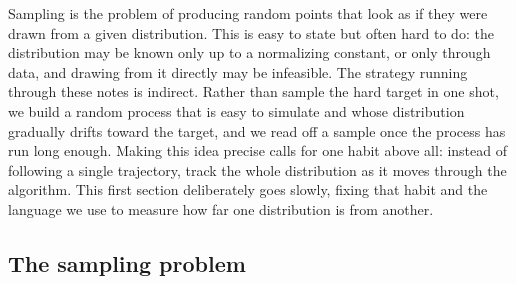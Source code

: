 \documentclass{amsart}
\numberwithin{equation}{section}
\theoremstyle{plain}
\theoremstyle{definition}
\theoremstyle{remark}
\begin{document}
Sampling is the problem of producing random points that look as if they were
drawn from a given distribution.  This is easy to state but often hard to do:
the distribution may be known only up to a normalizing constant, or only
through data, and drawing from it directly may be infeasible.  The strategy
running through these notes is indirect.  Rather than sample the hard target
in one shot, we build a random process that is easy to simulate and whose
distribution gradually drifts toward the target, and we read off a sample once
the process has run long enough.  Making this idea precise calls for one habit
above all: instead of following a single trajectory, track the whole
distribution as it moves through the algorithm.  This first section
deliberately goes slowly, fixing that habit and the language we use to measure
how far one distribution is from another.

\subsection{The sampling problem}\label{subsec:sampling-problem}
\end{document}
